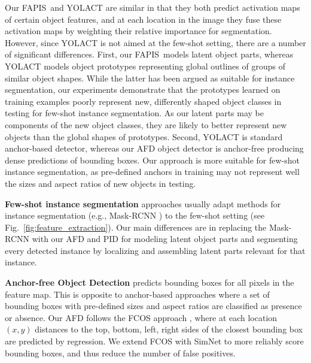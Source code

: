 \documentclass[final]{cvpr}
\def\Approach{FAPIS}
\begin{document}
Our \Approach~and YOLACT \cite{bolya2019yolact} are similar in that they both predict activation maps of certain object features, and at each location in the image they fuse these activation maps by weighting their relative importance for segmentation. However, since YOLACT  is not aimed at the few-shot setting, there are a number of significant differences.
First, our \Approach~models latent object parts, whereas YOLACT models object prototypes representing global outlines of groups of similar object shapes. While the latter has been argued as suitable for instance segmentation, our experiments demonstrate that the prototypes learned on training examples poorly represent new, differently shaped object classes in testing for few-shot instance segmentation. As our latent parts may be components of the new object classes, they are likely to better represent new objects than the global shapes of prototypes. Second, YOLACT is standard anchor-based detector, whereas our AFD object detector is anchor-free producing dense predictions of bounding boxes. Our approach is more suitable for few-shot instance segmentation, as pre-defined anchors in training may not represent well the sizes and aspect ratios of new objects in testing.



\textbf{Few-shot instance segmentation} approaches usually adapt methods for instance segmentation (e.g., Mask-RCNN  \cite{he2017mask}) to the few-shot setting \cite{michaelis2018one,yanICCV19metarcnn,fan2020fgn} (see Fig.~\ref{fig:feature_extraction}). Our main differences are in replacing the Mask-RCNN with our AFD and PID for modeling latent object parts and segmenting every detected instance by localizing and assembling latent parts relevant for that instance.


\textbf{Anchor-free Object Detection} \cite{tian2019fcos,zhou2019objects,law2018cornernet} predicts bounding boxes for all pixels in the feature map. This is opposite to anchor-based approaches \cite{ren2015faster,lin2017focal} where a set of bounding boxes with pre-defined sizes and aspect ratios are classified as presence or absence. Our AFD follows the FCOS approach \cite{tian2019fcos}, where at each location $(x,y)$ distances to the top, bottom, left, right sides of the closest bounding box are predicted by regression. We extend FCOS with SimNet to more reliably score bounding boxes, and thus reduce the number of false positives.
\end{document}
